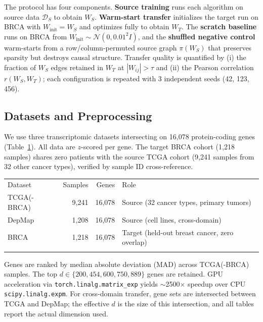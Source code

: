 \documentclass{ws-jbcb}
\begin{document}
The protocol has four components. \textbf{Source training} runs each algorithm on source data $\mathcal{D}_S$ to obtain $W_S$. \textbf{Warm-start transfer} initializes the target run on BRCA with $W_{\mathrm{init}} = W_S$ and optimizes fully to obtain $W_T$. The \textbf{scratch baseline} runs on BRCA from $W_{\mathrm{init}} \sim \mathcal{N}(0, 0.01^2 I)$, and the \textbf{shuffled negative control} warm-starts from a row/column-permuted source graph $\pi(W_S)$ that preserves sparsity but destroys causal structure. Transfer quality is quantified by (i) the fraction of $W_S$ edges retained in $W_T$ at $|W_{ij}| > \tau$ and (ii) the Pearson correlation $r(W_S, W_T)$; each configuration is repeated with 3 independent seeds (42, 123, 456).

\subsection{Datasets and Preprocessing}

We use three transcriptomic datasets intersecting on 16,078 protein-coding genes (Table~\ref{tab:data}). All data are $z$-scored per gene. The target BRCA cohort (1,218 samples) shares zero patients with the source TCGA cohort (9,241 samples from 32 other cancer types), verified by sample ID cross-reference.

\begin{table}[t]
{\begin{tabular}{@{}lrrl@{}} \toprule
Dataset & Samples & Genes & Role\\ \colrule
TCGA(-BRCA) & 9,241 & 16,078 & Source (32 cancer types, primary tumors)\\
DepMap & 1,208 & 16,078 & Source (cell lines, cross-domain)\\
BRCA & 1,218 & 16,078 & Target (held-out breast cancer, zero overlap)\\
\botrule
\end{tabular}}
\label{tab:data}
\end{table}

Genes are ranked by median absolute deviation (MAD) across TCGA(-BRCA) samples. The top $d \in \{200, 454, 600, 750, 889\}$ genes are retained. GPU acceleration via \texttt{torch.linalg.matrix\_exp} yields $\sim$2500$\times$ speedup over CPU \texttt{scipy.linalg.expm}. For cross-domain transfer, gene sets are intersected between TCGA and DepMap; the effective $d$ is the size of this intersection, and all tables report the actual dimension used.
\end{document}
